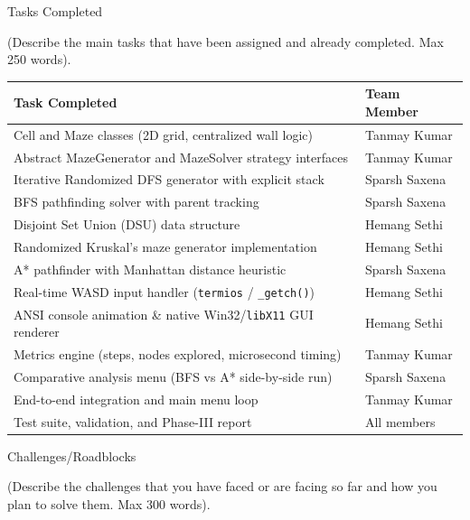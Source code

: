 \documentclass[12pt,a4paper]{article}
\renewcommand{\arraystretch}{1}
\newcommand{\secthead}[2]{%
  {\fontsize{18}{21.9}\selectfont\color{geheading}#1\par}\vspace{1.6pt}%
  {\fontsize{10.5}{14.5}\selectfont\color{gehint}#2\par}%
  \vspace{\secgap}}
\newlength{\secgap}\setlength{\secgap}{5.7pt}
\newcommand{\afterbox}{\vspace{\aftergap}}
\newlength{\aftergap}\setlength{\aftergap}{12pt}
\begin{document}
\vspace*{-0.15cm}

\secthead{Tasks Completed }{(Describe the main tasks that have been assigned and already completed. Max 250 words).}

{\fontsize{10.5}{12.8}\selectfont
\renewcommand{\arraystretch}{1.06}
\begin{tabularx}{\textwidth}{
|>{\raggedright\arraybackslash}X
|>{\raggedright\arraybackslash}p{}|
}
\hline
\textbf{Task Completed} & \textbf{Team Member} \\
\hline
Cell and Maze classes (2D grid, centralized wall logic) & Tanmay Kumar \\
\hline
Abstract MazeGenerator and MazeSolver strategy interfaces & Tanmay Kumar \\
\hline
Iterative Randomized DFS generator with explicit stack & Sparsh Saxena \\
\hline
BFS pathfinding solver with parent tracking & Sparsh Saxena \\
\hline
Disjoint Set Union (DSU) data structure & Hemang Sethi \\
\hline
Randomized Kruskal's maze generator implementation & Hemang Sethi \\
\hline
A* pathfinder with Manhattan distance heuristic & Sparsh Saxena \\
\hline
Real-time WASD input handler (\texttt{termios} / \texttt{\_getch()}) & Hemang Sethi \\
\hline
ANSI console animation \& native Win32/\texttt{libX11} GUI renderer & Hemang Sethi \\
\hline
Metrics engine (steps, nodes explored, microsecond timing) & Tanmay Kumar \\
\hline
Comparative analysis menu (BFS vs A* side-by-side run) & Sparsh Saxena \\
\hline
End-to-end integration and main menu loop & Tanmay Kumar \\
\hline
Test suite, validation, and Phase-III report & All members \\
\hline
\end{tabularx}
\renewcommand{\arraystretch}{1}
}

\afterbox

\secthead{Challenges/Roadblocks }{(Describe the challenges that you have faced or are facing so far and how you plan to solve them. Max 300 words).}
\end{document}

